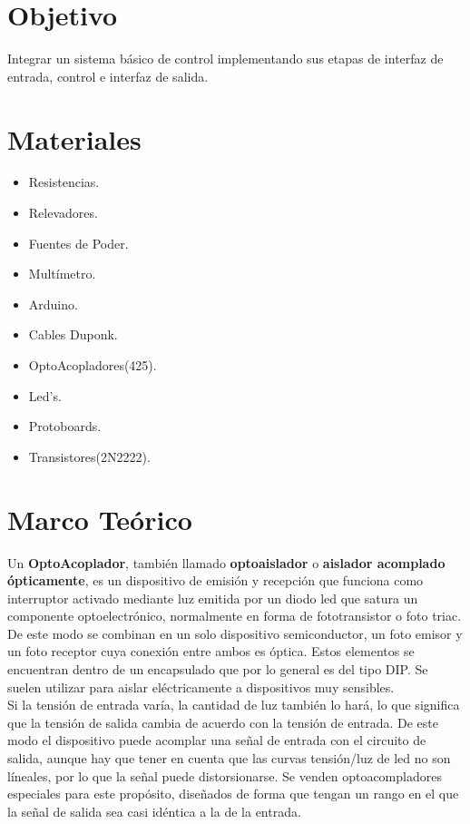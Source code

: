 \documentclass[11pt,a4paper]{article}
\begin{document}
\newpage

\section{Objetivo}

\begin{flushleft}
Integrar un sistema básico de control implementando sus etapas de interfaz de entrada, control e interfaz de salida.

\section{Materiales}

\begin{itemize}

\item Resistencias.
\item Relevadores.
\item Fuentes de Poder.
\item Multímetro.
\item Arduino.
\item Cables Duponk.
\item OptoAcopladores(425).
\item Led's.
\item Protoboards.
\item Transistores(2N2222).

\end{itemize}
\end{flushleft}
\section{Marco Teórico}

Un \textbf{OptoAcoplador}, también llamado \textbf{optoaislador} o \textbf{aislador acomplado ópticamente}, es un dispositivo de emisión y recepción que funciona como interruptor activado mediante luz emitida por un diodo led que satura un componente optoelectrónico, normalmente en forma de fototransistor o foto triac. De este modo se combinan en un solo dispositivo semiconductor, un foto emisor y un foto receptor cuya conexión entre ambos es óptica. Estos elementos se encuentran dentro de un encapsulado que por lo general es del tipo DIP. Se suelen utilizar para aislar eléctricamente a dispositivos muy sensibles.\\


Si la tensión de entrada varía, la cantidad de luz también lo hará, lo que significa que la tensión de salida cambia de acuerdo con la tensión de entrada. De este modo el dispositivo puede acomplar una señal de entrada con el circuito de salida, aunque hay que tener en cuenta que las curvas tensión/luz de led no son líneales, por lo que la señal puede distorsionarse. Se venden optoacompladores especiales para este propósito, diseñados de forma que tengan un rango en el que la señal de salida sea casi idéntica a la de la entrada.
\\
\end{document}
